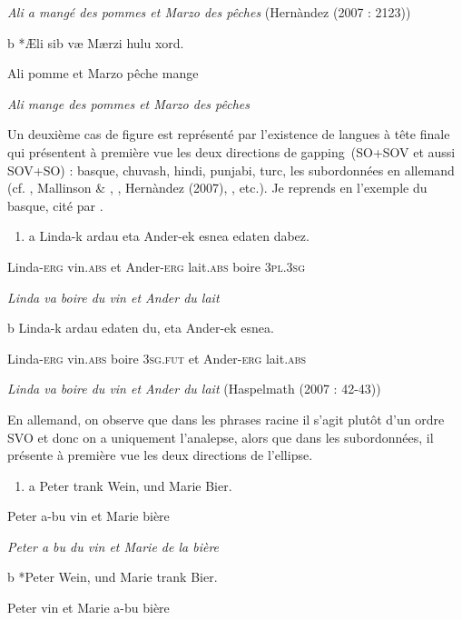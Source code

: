 \textit{Ali a mangé des pommes et Marzo des pêches}       (Hernàndez (2007 : 2123))

  b  *{\AE}li  sib  v{\ae}  M{\ae}rzi  hulu  xord.

Ali  pomme  et  Marzo  pêche  mange

{\itshape
Ali mange des pommes et Marzo des pêches}

Un deuxième cas de figure est représenté par l'existence de langues à tête finale qui présentent à première vue les deux directions de gapping~(SO+SOV et aussi SOV+SO) : basque, chuvash, hindi, punjabi, turc, les subordonnées en allemand (cf. \citet{Maling1972}, Mallinson \& \citet{Blake1981}, \citet{Kazenin2001}, Hernàndez (2007), \citet{Haspelmath2007}, etc.). Je reprends en  l'exemple du basque, cité par \citet{Haspelmath2007}.


\begin{enumerate}
\item \label{bkm:Ref287315344}a  Linda-k  ardau  eta  Ander-ek  esnea  edaten  dabez.


\end{enumerate}
Linda-\textsc{erg } vin.\textsc{abs}  et  Ander\textsc{-erg}  lait\textsc{.abs}  boire    \textsc{3pl.3sg} 

{\itshape
Linda va boire du vin et Ander du lait}

 b  Linda-k  ardau  edaten  du,  eta  Ander-ek  esnea.

Linda-\textsc{erg } vin.\textsc{abs}  boire  \textsc{3sg.fut}  et  Ander\textsc{-erg}  lait\textsc{.abs} 

\textit{Linda va boire du vin et Ander du lait     } (Haspelmath (2007 : 42-43))

En allemand, on observe que dans les phrases racine il s'agit plutôt d'un ordre SVO et donc on a uniquement l'analepse, alors que dans les subordonnées, il présente à première vue les deux directions de l'ellipse.


\begin{enumerate}
\item a  Peter  trank  Wein,  und  Marie  Bier.


\end{enumerate}
Peter  a-bu  vin  et  Marie  bière

{\itshape
  Peter a bu du vin et Marie de la bière     } 

  b  *Peter  Wein,  und  Marie  trank  Bier.

Peter  vin  et  Marie  a-bu  bière

